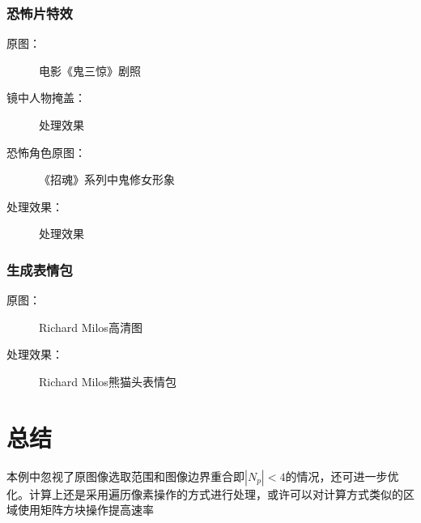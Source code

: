\documentclass[14pt]{scrartcl} %
\begin{document}
	\pagebreak
	
	\subsubsection{恐怖片特效}
	
	原图：
	\begin{figure}[h] %
		\centering
		\caption{电影《鬼三惊》剧照}
	\end{figure}
	
	镜中人物掩盖：
	\begin{figure}[h] %
		\centering
		\caption{处理效果}
	\end{figure}
	
	\pagebreak
	恐怖角色原图：
	\begin{figure}[h] %
		\centering
		\caption{《招魂》系列中鬼修女形象}
	\end{figure}
	
	处理效果：
	\begin{figure}[h] %
		\centering
		\caption{处理效果}
	\end{figure}
	
	
	\pagebreak
	\subsubsection{生成表情包}
	原图：
	\begin{figure}[h] %
		\centering
		\caption{Richard Milos高清图}
	\end{figure}
	
	处理效果：
	\begin{figure}[h] %
		\centering
		\caption{Richard Milos熊猫头表情包}
	\end{figure}
	
	\pagebreak
	\section{总结}
	本例中忽视了原图像选取范围和图像边界重合即$|N_p|<4$的情况，还可进一步优化。计算上还是采用遍历像素操作的方式进行处理，或许可以对计算方式类似的区域使用矩阵方块操作提高速率
	
	
	
	
\end{document}
